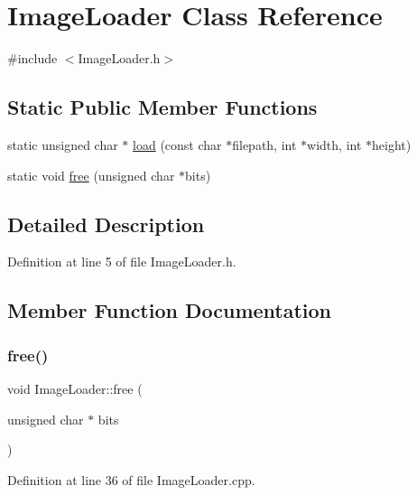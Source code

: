 \hypertarget{class_image_loader}{}\section{Image\+Loader Class Reference}
\label{class_image_loader}


{\ttfamily \#include $<$Image\+Loader.\+h$>$}

\subsection*{Static Public Member Functions}
\begin{DoxyCompactItemize}
\item 
static unsigned char $\ast$ \hyperlink{class_image_loader_af2b82932ce07681d384ac827c48f76e7}{load} (const char $\ast$filepath, int $\ast$width, int $\ast$height)
\item 
static void \hyperlink{class_image_loader_a3b6851be17b336e8d5f7bf914d6aa971}{free} (unsigned char $\ast$bits)
\end{DoxyCompactItemize}


\subsection{Detailed Description}


Definition at line 5 of file Image\+Loader.\+h.



\subsection{Member Function Documentation}
\mbox{\label{class_image_loader_a3b6851be17b336e8d5f7bf914d6aa971}} 
\subsubsection{\texorpdfstring{free()}{free()}}
{\footnotesize\ttfamily void Image\+Loader\+::free (\begin{DoxyParamCaption}\item[{unsigned char $\ast$}]{bits }\end{DoxyParamCaption})\hspace{0.3cm}{\ttfamily [static]}}



Definition at line 36 of file Image\+Loader.\+cpp.

